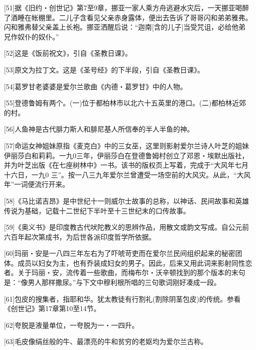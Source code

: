 \documentclass{article}
\begin{document}
[51]据《旧约・创世记》第7至9章，挪亚一家人乘方舟逃避水灾后，一天挪亚喝醉了酒睡在帐棚里。二儿子含看见父亲赤身露体，便出去告诉了哥哥闪和弟弟雅弗。闪和雅弗替父亲盖上长袍。挪亚洒醒后说：“迦南[含的儿子]当受咒诅，必给他弟兄作奴仆的奴仆。”



[52]这是《饭前祝文》，引自《圣教日课》。



[53]原文为拉丁文。这是《圣号经》的下半段，引自《圣教日课》。



[54]葛罗甘老婆婆是爱尔兰歌曲《内德・葛罗甘》中的人物。



[55]登德鲁姆有两个。(一)位于都柏林市以北六十五英里的港口。(二)都柏林近郊的村。



[56]人鱼神是古代腓力斯人和腓尼基人所信奉的半人半鱼的神。



[57]命运女神姐妹原指《麦克白》中的三女巫，这里则影射爱尔兰诗人叶芝的姐妹伊丽莎白和莉莉。一九0三年，伊丽莎白在登德鲁姆村创立了邓恩・埃默出版社，并为叶芝出版《在七座树林中》一书。该书的版权页上写着，完成于“大风年七月十六日，一九0 三”。按一八三九年爱尔兰曾遭受一场空前的大风灾。从此，“大风年”一词便流行开来。



[58]《马比诺吉昂》是中世纪十一则威尔士故事的总称，以神话、民间故事和英雄传说为基础，记载十二世纪下半叶至十三世纪末的口传故事。



[59]《奥义书》是印度教古代吠陀教义的思辨作品，用散文或韵文写成。自公元前六百年起次第成书，为后世各派印度哲学所依据。



[60]玛丽・安是一八四三年左右为了吓唬苛吏而在爱尔兰民间组织起来的秘密团体。成员以妇女为主，也有乔装成妇女的男子。因此，后来又用此词来影射同性恋者。关于玛丽・安，流传着一些歌曲，而梅布尔・沃辛顿找到的那个版本的末句是：“像男人那样撒尿。”与下文中穆利根所唱的三句歌词刚好凑成一段。



[61]包皮的搜集者，指耶和华。犹太教徒有行割礼(割除阴茎包皮)的传统。参看《创世记》第17章第10至14节。



[62]夸脱是液量单位，一夸脱为一・一四升。



[63]毛皮像绢丝般的牛、最漂亮的牛和贫穷的老妪均为爱尔兰古称。
\end{document}
